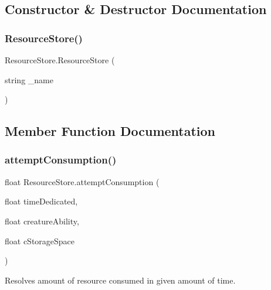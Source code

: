 \subsection{Constructor \& Destructor Documentation}
\mbox{\label{class_resource_store_aa9d9ff044e6156590656f1471b6d3e7d}} 
\subsubsection{\texorpdfstring{Resource\+Store()}{ResourceStore()}}
{\footnotesize\ttfamily Resource\+Store.\+Resource\+Store (\begin{DoxyParamCaption}\item[{string}]{\+\_\+name }\end{DoxyParamCaption})}



\subsection{Member Function Documentation}
\mbox{\label{class_resource_store_a0a779526593c2dab8e6b9d9e4d5013e6}} 
\subsubsection{\texorpdfstring{attempt\+Consumption()}{attemptConsumption()}}
{\footnotesize\ttfamily float Resource\+Store.\+attempt\+Consumption (\begin{DoxyParamCaption}\item[{float}]{time\+Dedicated,  }\item[{float}]{creature\+Ability,  }\item[{float}]{c\+Storage\+Space }\end{DoxyParamCaption})}



Resolves amount of resource consumed in given amount of time. 

\mbox{\label{class_resource_store_aa3b1414c69c413330e41fc53b32563ca}} 
